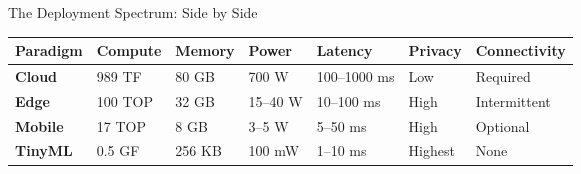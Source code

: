 \documentclass[aspectratio=169, 12pt]{beamer}
\begin{document}
\begin{frame}{The Deployment Spectrum: Side by Side}
\note{
%
%
%
%
%
}

\scriptsize
\renewcommand{\arraystretch}{1.0}
\begin{tabular}{@{}lllllll@{}}
  \toprule
  \textbf{Paradigm} & \textbf{Compute} & \textbf{Memory} & \textbf{Power} & \textbf{Latency} & \textbf{Privacy} & \textbf{Connectivity} \\
  \midrule
  \textbf{Cloud}  & 989 TF  & 80 GB  & 700 W    & 100--1000 ms & Low     & Required \\
  \textbf{Edge}   & 100 TOP & 32 GB  & 15--40 W & 10--100 ms   & High    & Intermittent \\
  \textbf{Mobile} & 17 TOP  & 8 GB   & 3--5 W   & 5--50 ms     & High    & Optional \\
  \textbf{TinyML} & 0.5 GF  & 256 KB & 100 mW   & 1--10 ms     & Highest & None \\
  \bottomrule
\end{tabular}


\end{frame}
\end{document}
